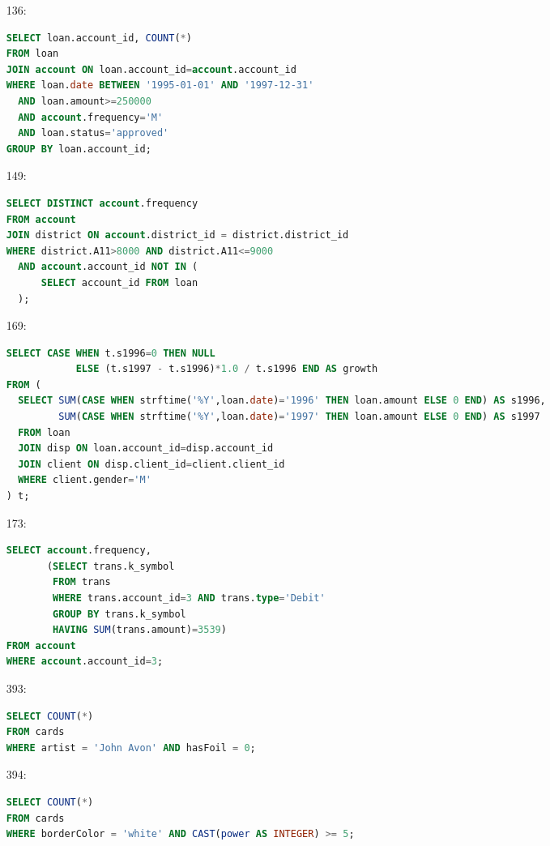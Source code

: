 \documentclass[11pt]{article}
\begin{document}
\begin{enumerate}
\item[136:]
\begin{lstlisting}[language=SQL]
SELECT loan.account_id, COUNT(*)
FROM loan
JOIN account ON loan.account_id=account.account_id
WHERE loan.date BETWEEN '1995-01-01' AND '1997-12-31'
  AND loan.amount>=250000
  AND account.frequency='M'
  AND loan.status='approved'
GROUP BY loan.account_id;
\end{lstlisting}

\item[149:]
\begin{lstlisting}[language=SQL]
SELECT DISTINCT account.frequency
FROM account
JOIN district ON account.district_id = district.district_id
WHERE district.A11>8000 AND district.A11<=9000
  AND account.account_id NOT IN (
      SELECT account_id FROM loan
  );
\end{lstlisting}

\item[169:]
\begin{adjustbox}{max width=\textwidth}
\begin{lstlisting}[language=SQL]
SELECT CASE WHEN t.s1996=0 THEN NULL
            ELSE (t.s1997 - t.s1996)*1.0 / t.s1996 END AS growth
FROM (
  SELECT SUM(CASE WHEN strftime('%Y',loan.date)='1996' THEN loan.amount ELSE 0 END) AS s1996,
         SUM(CASE WHEN strftime('%Y',loan.date)='1997' THEN loan.amount ELSE 0 END) AS s1997
  FROM loan
  JOIN disp ON loan.account_id=disp.account_id
  JOIN client ON disp.client_id=client.client_id
  WHERE client.gender='M'
) t;
\end{lstlisting}
\end{adjustbox}

\item[173:]
\begin{lstlisting}[language=SQL]
SELECT account.frequency,
       (SELECT trans.k_symbol
        FROM trans
        WHERE trans.account_id=3 AND trans.type='Debit'
        GROUP BY trans.k_symbol
        HAVING SUM(trans.amount)=3539)
FROM account
WHERE account.account_id=3;
\end{lstlisting}

\item[393:]
\begin{lstlisting}[language=SQL]
SELECT COUNT(*)
FROM cards
WHERE artist = 'John Avon' AND hasFoil = 0;
\end{lstlisting}

\item[394:]
\begin{lstlisting}[language=SQL]
SELECT COUNT(*)
FROM cards
WHERE borderColor = 'white' AND CAST(power AS INTEGER) >= 5;
\end{lstlisting}


\end{enumerate}
\end{document}
